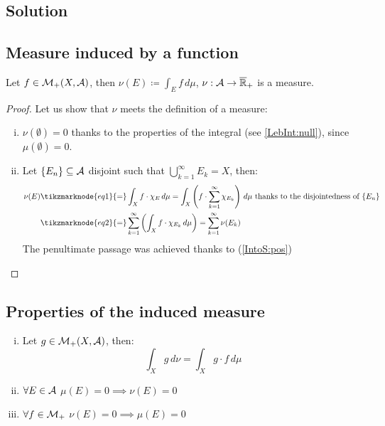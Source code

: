 \subsection*{Solution}

\subsection{Measure induced by a function}
Let $f \in\mathcal{M}_+(X, \mathcal{A})$, then $\nu(E) \coloneqq \int_E f \, d\mu$, $\nu: \mathcal{A} \to \overline{\mathbb{R}}_{+}$ is a measure.

\begin{proof} Let us show that $\nu$ meets the definition of a measure:
    \begin{enumerate}[i)]
        \item $\nu(\emptyset) = 0$ thanks to the properties of the integral (see \ref{LebInt:null}), since $\mu(\emptyset)=0$.
        \item Let $\{ E_n \}\subseteq \mathcal{A}$ disjoint such that $\bigcup_{k=1}^\infty E_k = X$, then:
            \begin{align*}
                \nu(E) & \tikzmarknode{eq1}{=} \int_X f \cdot \chi_E \, d\mu = \int_X \left( f \cdot \sum_{k=1}^\infty \chi_{E_k} \right) \, d\mu \text{ thanks to the disjointedness of } \seq{E} \\
                & \tikzmarknode{eq2}{=} \sum_{k=1}^\infty \left( \int_X f\cdot \chi_{E_k} \, d\mu \right) = \sum_{k=1}^\infty \nu(E_k)
            \end{align*} 
            The penultimate passage was achieved thanks to (\ref{IntoS:pos})
    \end{enumerate}
\end{proof}

\subsection{Properties of the induced measure}
\begin{enumerate}[i)]
    \item Let $g\in\mathcal{M}_+(X,\mathcal{A})$, then: 
        \[
            \int_X g \, d\nu = \int_X g\cdot f \, d\mu    
        \]
    \item $\forall E \in \mathcal{A}$  $\mu(E)=0\implies \nu(E)=0$
    \item $\forall f\in \mathcal{M}_+$  $\nu(E) = 0 \implies \mu(E)=0$
\end{enumerate}

